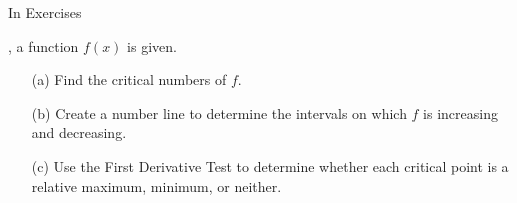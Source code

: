{\noindent In Exercises}
{, a function $f(x)$ is given.
	\begin{enumerate}
	\item	[(a)] Find the critical numbers of $f$.
	\item	[(b)] Create a number line to determine the intervals on which $f$ is increasing and decreasing.
	\item	[(c)] Use the First Derivative Test to determine whether each critical point is a relative maximum, minimum, or neither.
	\end{enumerate}
}
